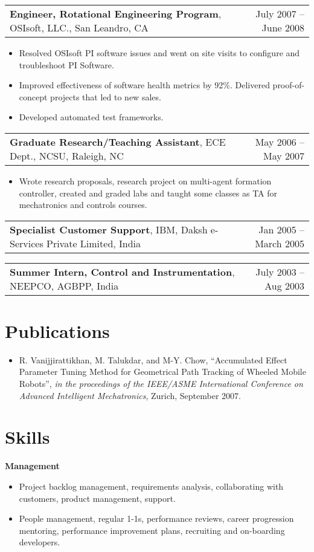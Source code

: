 \documentclass[letterpaper,10pt]{article}
\makeatletter
\newcommand{\experienceItem}[3]{
	\begin{tabular*}{\textwidth}{c@{\extracolsep{\fill}}c}
		\multicolumn{1}{l}{\textbf{#1}, #2} & \multicolumn{1}{r}{#3}\\
	\end{tabular*}\vspace{-10pt}
}
\newcommand{\resumeItemListStart}{\begin{itemize}}
\newcommand{\resumeItemListEnd}{\end{itemize}}
\newcommand{\resumeListItem}[1]{
	\item{#1 \vspace{-6pt}}
}
\makeatother
\begin{document}
	\experienceItem{Engineer, Rotational Engineering Program}{OSIsoft, LLC., San Leandro, CA}{July 2007 -- June 2008}
	\vspace{-8pt}	
	\resumeItemListStart
	\resumeListItem {Resolved OSIsoft PI software issues and went on site visits to configure and troubleshoot PI Software.}
	\resumeListItem {Improved effectiveness of software health metrics by 92\%. Delivered proof-of-concept projects that led to new sales.}
	\resumeListItem {Developed automated test frameworks.}
	\resumeItemListEnd
	
	\experienceItem{Graduate Research/Teaching Assistant}{ECE Dept., NCSU, Raleigh, NC}{May 2006 -- May 2007}
	\vspace{-8pt}
	\resumeItemListStart
	\resumeListItem {Wrote research proposals, research project on multi-agent formation controller, created and graded labs and taught some classes as TA for mechatronics and controls courses.}
	\resumeItemListEnd
	
	\experienceItem{Specialist Customer Support}{IBM, Daksh e-Services Private Limited, India}{Jan 2005 -- March 2005}
	
	\experienceItem{Summer Intern, Control and Instrumentation}{NEEPCO, AGBPP, India}{July 2003 -- Aug 2003}

	\section{Publications}
	
	\resumeItemListStart
	\resumeListItem {R. Vanijjirattikhan, M. Talukdar, and M-Y. Chow, ``Accumulated Effect Parameter Tuning Method for Geometrical Path Tracking of Wheeled Mobile Robots'', \textit{in the proceedings of the IEEE/ASME International Conference on Advanced Intelligent Mechatronics}, Zurich, September 2007.}
	\resumeItemListEnd

	\section{Skills}

	\textbf{Management}\vspace{-8pt}
	\resumeItemListStart
	\resumeListItem{Project backlog management, requirements analysis, collaborating with customers, product management, support.}
	\resumeListItem {People management, regular 1-1s, performance reviews, career progression mentoring, performance improvement plans, recruiting and on-boarding developers.}
	\resumeItemListEnd
\end{document}
